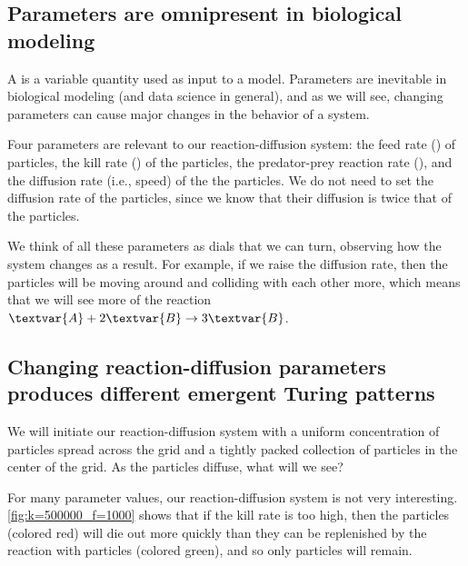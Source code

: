 \subsection{Parameters are omnipresent in biological modeling}

A  is a variable quantity used as input to a model. Parameters are inevitable in biological modeling (and data science in general), and as we will see, changing parameters can cause major changes in the behavior of a system.

Four parameters are relevant to our reaction-diffusion system: the feed rate () of  particles, the kill rate () of the  particles, the predator-prey reaction rate (), and the diffusion rate (i.e., speed) of the the  particles. We do not need to set the diffusion rate of the  particles, since we know that their diffusion is twice that of the  particles.

We think of all these parameters as dials that we can turn, observing how the system changes as a result. For example, if we raise the diffusion rate, then the particles will be moving around and colliding with each other more, which means that we will see more of the reaction $\textvar{A} + 2\textvar{B} \rightarrow 3\textvar{B}$.\\

\begin{qbox}\end{qbox}

\FloatBarrier
{}
\subsection{Changing reaction-diffusion parameters produces different emergent Turing patterns}

We will initiate our reaction-diffusion system with a uniform concentration of  particles spread across the grid and a tightly packed collection of  particles in the center of the grid. As the  particles diffuse, what will we see?

For many parameter values, our reaction-diffusion system is not very interesting. \autoref{fig:k=500000_f=1000} shows that if the kill rate is too high, then the  particles (colored red) will die out more quickly than they can be replenished by the reaction with  particles (colored green), and so only  particles will remain.


